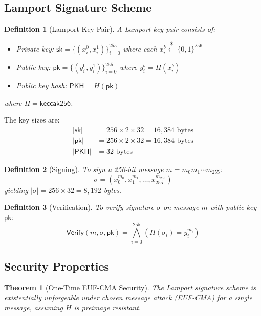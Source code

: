 \documentclass[11pt,a4paper]{article}
\newtheorem{theorem}{Theorem}
\newtheorem{definition}{Definition}
\begin{document}
\subsection{Lamport Signature Scheme}

\begin{definition}[Lamport Key Pair]
A Lamport key pair consists of:
\begin{itemize}
    \item Private key: $\mathsf{sk} = \{(x_i^0, x_i^1)\}_{i=0}^{255}$ where each $x_i^b \xleftarrow{\$} \{0,1\}^{256}$
    \item Public key: $\mathsf{pk} = \{(y_i^0, y_i^1)\}_{i=0}^{255}$ where $y_i^b = H(x_i^b)$
    \item Public key hash: $\mathsf{PKH} = H(\mathsf{pk})$
\end{itemize}
where $H = \mathsf{keccak256}$.
\end{definition}

The key sizes are:
\begin{align*}
|\mathsf{sk}| &= 256 \times 2 \times 32 = 16,384 \text{ bytes} \\
|\mathsf{pk}| &= 256 \times 2 \times 32 = 16,384 \text{ bytes} \\
|\mathsf{PKH}| &= 32 \text{ bytes}
\end{align*}

\begin{definition}[Signing]
To sign a 256-bit message $m = m_0 m_1 \cdots m_{255}$:
\[
\sigma = (x_0^{m_0}, x_1^{m_1}, \ldots, x_{255}^{m_{255}})
\]
yielding $|\sigma| = 256 \times 32 = 8,192$ bytes.
\end{definition}

\begin{definition}[Verification]
To verify signature $\sigma$ on message $m$ with public key $\mathsf{pk}$:
\[
\mathsf{Verify}(m, \sigma, \mathsf{pk}) = \bigwedge_{i=0}^{255} \left( H(\sigma_i) = y_i^{m_i} \right)
\]
\end{definition}

\subsection{Security Properties}

\begin{theorem}[One-Time EUF-CMA Security]
The Lamport signature scheme is existentially unforgeable under chosen message attack (EUF-CMA) for a single message, assuming $H$ is preimage resistant.
\end{theorem}
\end{document}
